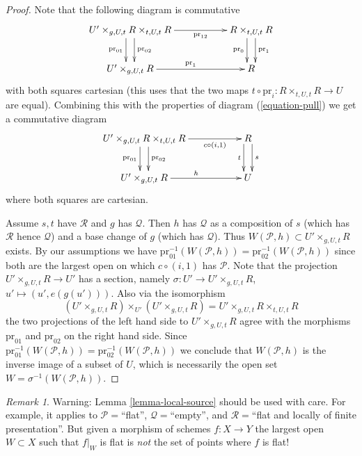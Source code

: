 \documentclass{stacks-project}
\theoremstyle{plain}
\theoremstyle{definition}
\theoremstyle{remark}
\newtheorem{remark}[subsection]{Remark}
\numberwithin{equation}{subsection}
\begin{document}
\begin{proof}
Note that the following diagram is commutative
$$
\xymatrix{
U' \times_{g, U, t} R \times_{t, U, t} R
\ar[rr]_-{\text{pr}_{12}}
\ar@<1ex>[d]^-{\text{pr}_{02}} \ar@<-1ex>[d]_-{\text{pr}_{01}} & &
R \times_{t, U, t} R
\ar@<1ex>[d]^-{\text{pr}_1} \ar@<-1ex>[d]_-{\text{pr}_0}
\\
U' \times_{g, U, t} R \ar[rr]^{\text{pr}_1} & & R
}
$$
with both squares cartesian (this uses that the two maps
$t \circ \text{pr}_i : R \times_{t, U, t} R \to U$ are equal).
Combining this with the properties of diagram (\ref{equation-pull})
we get a commutative diagram
$$
\xymatrix{
U' \times_{g, U, t} R \times_{t, U, t} R
\ar[rr]_-{c \circ (i, 1)}
\ar@<1ex>[d]^-{\text{pr}_{02}} \ar@<-1ex>[d]_-{\text{pr}_{01}} & &
R
\ar@<1ex>[d]^-{s} \ar@<-1ex>[d]_-{t}
\\
U' \times_{g, U, t} R \ar[rr]^h & & U
}
$$
where both squares are cartesian.

\medskip\noindent
Assume $s, t$ have $\mathcal{R}$ and $g$ has $\mathcal{Q}$.
Then $h$ has $\mathcal{Q}$ as a composition of $s$ (which has
$\mathcal{R}$ hence $\mathcal{Q}$) and a base change of $g$ (which
has $\mathcal{Q}$). Thus $W(\mathcal{P}, h) \subset U' \times_{g, U, t} R$
exists. By our assumptions we have
$\text{pr}_{01}^{-1}(W(\mathcal{P}, h)) =
\text{pr}_{02}^{-1}(W(\mathcal{P}, h))$
since both are the largest open on which $c \circ (i, 1)$ has $\mathcal{P}$.
Note that the projection $U' \times_{g, U, t} R \to U'$ has a section, namely
$\sigma : U' \to U' \times_{g, U, t} R$, $u' \mapsto (u', e(g(u')))$.
Also via the isomorphism
$$
(U' \times_{g, U, t} R) \times_{U'} (U' \times_{g, U, t} R)
=
U' \times_{g, U, t} R \times_{t, U, t} R
$$
the two projections of the left hand side
to $U' \times_{g, U, t} R$ agree with the morphisms $\text{pr}_{01}$
and $\text{pr}_{02}$ on the right hand side. Since
$\text{pr}_{01}^{-1}(W(\mathcal{P}, h)) =
\text{pr}_{02}^{-1}(W(\mathcal{P}, h))$
we conclude that $W(\mathcal{P}, h)$ is the inverse image of a subset of $U$,
which is necessarily the open set
$W = \sigma^{-1}(W(\mathcal{P}, h))$.
\end{proof}

\begin{remark}
\label{remark-local-source-warning}
Warning:
Lemma \ref{lemma-local-source}
should be used with care.
For example, it applies to $\mathcal{P}=$``flat'', $\mathcal{Q}=$``empty'',
and $\mathcal{R}=$``flat and locally of finite presentation''. But given a
morphism of schemes $f : X \to Y$ the largest open $W \subset X$ such that
$f|_W$ is flat is {\it not} the set of points where $f$ is flat!
\end{remark}
\end{document}
